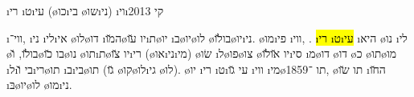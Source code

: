 \textheader%
{\i{רי} \i{ט}\i{עי}}
{(\o{כו}\i{בי} \o{שו}\i{ני})}
{}
{\i{וי}\i{קי}}
{}
{}
{2013}



%
{   \i{ווי}־, \i{ני}  \i{לי}\i{אי}  \o{לו}\o{דו}  \i{ה}\u{מו}\o{יו} \u{עו}\i{ת}\o{יו} \i{ב}\o{יו}\o{לו} \o{בו}\u{לו}\o{יו}\i{ני}.  \o{מו}\i{פי} \i{ווי},  .}
\hl{\i{רי} \i{ט}\i{עי}} \i{היא} \o{נו} \i{לי} \o{בו}\u{לו}, \u{ו}\o{בו} \u{כו}\o{נו} \o{תו}\i{ת}\o{יו}  \u{צו}\i{רי} (\o{או}\i{ני}\i{מי}) \o{שׂו} \i{ל}\o{פו}\o{צו} \o{יו} \u{או}\u{לו}\i{סי} \i{מ}\o{דו} \o{דו} \o{כ}  \o{תו}\o{מו} \i{ל}\i{בי}  \u{ו}\i{רי}\o{תו} \i{ב}\i{בי}\o{תו} (\u{גו} \o{קו}\o{לו}\i{גי} \o{לו}).  \o{יו} \i{רי} \i{ט}\i{עי} \u{גו}  \i{ווי} \i{מי}\o{תו}    ־1859, \o{תו}   \u{שו} \i{ה}\u{חו} \i{בּ}\o{יו}\o{לו} \o{מו}\i{ני}.

